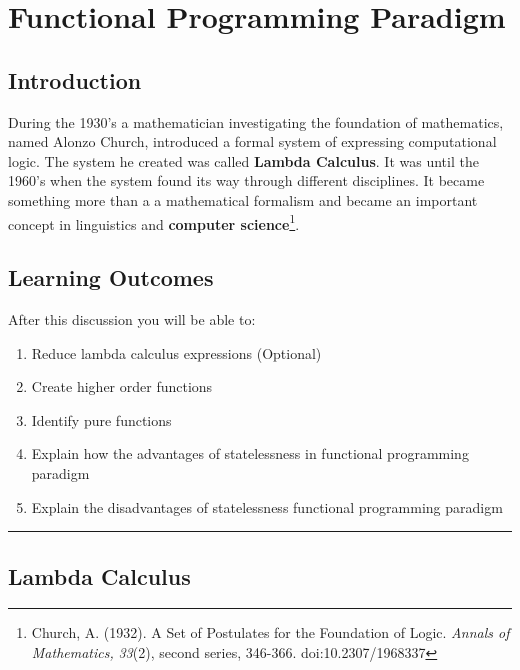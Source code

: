 \chapter{Functional Programming
Paradigm}\label{functional-programming-paradigm.md__functional-programming-paradigm}

\section{Introduction}\label{functional-programming-paradigm.md__introduction}

During the 1930's a mathematician investigating the foundation of
mathematics, named Alonzo Church, introduced a formal system of
expressing computational logic. The system he created was called
\textbf{Lambda Calculus}. It was until the 1960's when the system found
its way through different disciplines. It became something more than a a
mathematical formalism and became an important concept in linguistics
and \textbf{computer science}\footnote{Church, A. (1932). A Set of
  Postulates for the Foundation of Logic. \emph{Annals of Mathematics,}
  \emph{33}(2), second series, 346-366. doi:10.2307/1968337}.

\section{Learning
Outcomes}\label{functional-programming-paradigm.md__learning-outcomes}

After this discussion you will be able to:

\begin{enumerate}
\def\labelenumi{\arabic{enumi}.}
\tightlist
\item
  Reduce lambda calculus expressions (Optional)
\item
  Create higher order functions
\item
  Identify pure functions
\item
  Explain how the advantages of statelessness in functional programming
  paradigm
\item
  Explain the disadvantages of statelessness functional programming
  paradigm
\end{enumerate}

\begin{center}\rule{0.5\linewidth}{0.5pt}\end{center}

\section{Lambda
Calculus}\label{functional-programming-paradigm.md__lambda-calculus}


